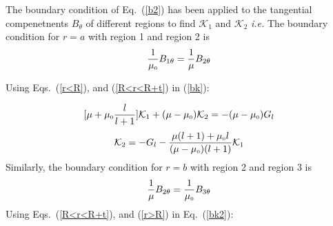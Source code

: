 The boundary condition of Eq.~(\ref{b2}) has been applied to the tangential compenetnents $B_\theta$ of different regions to find \(\mathcal{K}_1\) and \(\mathcal{K}_2\) \textit{i.e.}
The boundary condition for $r=a$ with region 1 and region 2 is
\begin{equation}\label{bk}
\frac{1}{\mu_{\scriptscriptstyle 0}} B_{1\theta}=  \frac{1}{\mu} B_{2\theta}  
\end{equation}

Using Eqs.~(\ref{r<R}), and (\ref{R<r<R+t}) in (\ref{bk}):





\begin{equation}\label{es1}
[\mu+\mu_{\scriptscriptstyle 0}\frac{l}{l+1}]\mathcal{K}_1 +(\mu-\mu_{\scriptscriptstyle 0})\mathcal{K}_2=-(\mu-\mu_{\scriptscriptstyle 0})G_l
\end{equation}
\begin{equation}\label{k2}
\mathcal{K}_2=-G_l-\frac{\mu(l+1)+\mu_{\scriptscriptstyle 0} l}{(\mu-\mu_{\scriptscriptstyle 0})(l+1)}\mathcal{K}_1
\end{equation}
Similarly, the boundary condition for $r=b$ with region 2 and region 3 is 
\begin{equation}\label{bk2}
    \frac{1}{\mu} B_{2\theta}=\frac{1}{\mu_{\scriptscriptstyle 0}}B_{3\theta}
\end{equation}
Using Eqs.~(\ref{R<r<R+t}), and (\ref{r>R}) in Eq.~(\ref{bk2}):


